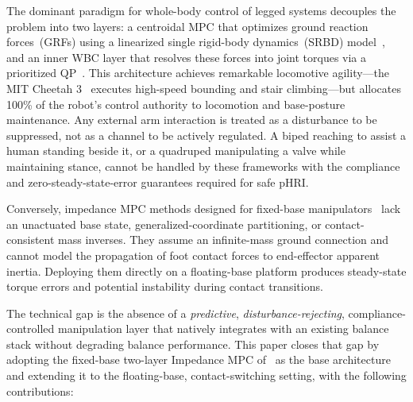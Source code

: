 The dominant paradigm for whole-body control of legged systems decouples
the problem into two layers: a centroidal MPC that optimizes ground
reaction forces~(GRFs) using a linearized single rigid-body dynamics~(SRBD)
model~\cite{dicarlo2018dynamic,kim2019highly}, and an inner WBC layer that
resolves these forces into joint torques via a prioritized
QP~\cite{bellicoso2016perception,koolen2016design}.
This architecture achieves remarkable locomotive agility---the MIT Cheetah
3~\cite{dicarlo2018dynamic} executes high-speed bounding and stair
climbing---but allocates 100\% of the robot's control authority to
locomotion and base-posture maintenance.
Any external arm interaction is treated as a disturbance to be suppressed,
not as a channel to be actively regulated.
A biped reaching to assist a human standing beside it, or a quadruped
manipulating a valve while maintaining stance, cannot be handled by these
frameworks with the compliance and zero-steady-state-error guarantees
required for safe pHRI.

Conversely, impedance MPC methods designed for fixed-base
manipulators~\cite{cao2026impedance,cao2023passive,haninger2022model,roveda2020model}
lack an unactuated base state, generalized-coordinate partitioning, or
contact-consistent mass inverses.
They assume an infinite-mass ground connection and cannot model the
propagation of foot contact forces to end-effector apparent inertia.
Deploying them directly on a floating-base platform produces steady-state
torque errors and potential instability during contact transitions.

The technical gap is the absence of a \emph{predictive},
\emph{disturbance-rejecting}, compliance-controlled manipulation layer that
natively integrates with an existing balance stack without degrading balance
performance. This paper closes that gap by adopting the fixed-base
two-layer Impedance MPC of~\cite{cao2026impedance} as the base architecture
and extending it to the floating-base, contact-switching setting, with the
following contributions:

